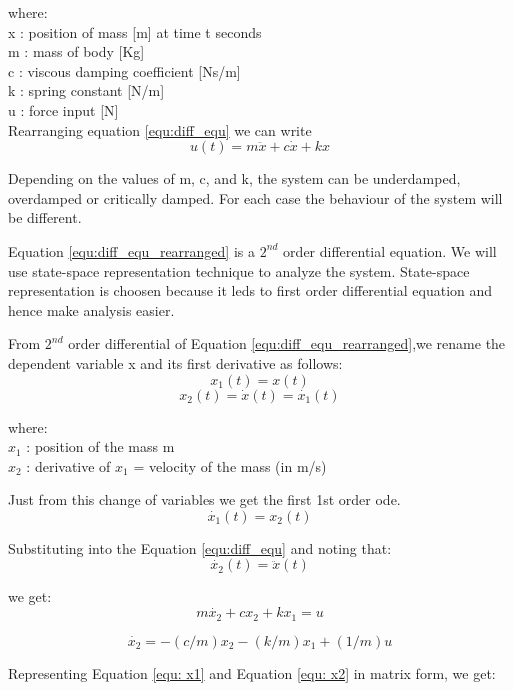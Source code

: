 \documentclass[a4paper,12pt,twocolumn]{article}
\begin{document}
where: \\
x : position of mass [m] at time t seconds \\
m : mass of body [Kg] \\
c : viscous damping coefficient [Ns/m] \\
k : spring constant [N/m] \\
u : force input [N] \\

Rearranging equation \ref{equ:diff_equ} we can write 
\begin{equation}
  u(t) = m \ddot{x} + c \dot{x} + kx
 \label{equ:diff_equ_rearranged}
\end{equation}

Depending on the values of m, c, and k, the system can be underdamped, overdamped or critically damped. For each case the behaviour of the system will be different.

Equation \ref{equ:diff_equ_rearranged} is a $2^{nd}$ order differential equation. We will use state-space representation technique to analyze the system. State-space representation is choosen because it leds to first order differential equation and hence make analysis easier.

From $2^{nd}$ order differential of Equation \ref{equ:diff_equ_rearranged},we rename the dependent variable x and its first derivative as follows: \\
  \[ x_1(t) = x(t) \] 
  \[ x_2(t) = \dot{x}(t) = \dot{x_1}(t) \] 
  
where: \\
$x_1$ : position of the mass m \\
$x_2$ : derivative of $x_1$ = velocity of the mass (in m/s)

Just from this change of variables we get the first 1st order ode.
\begin{equation}
\dot{x_1}(t)=x_2(t)
\label{equ:x1}
\end{equation}

Substituting into the Equation \ref{equ:diff_equ} and noting that:
\[\dot{x_2}(t)=\ddot{x}(t)\]

we get:
\begin{equation}
m \dot{x_2} + c {x_2} + k x_1 = u
\end{equation}

\begin{equation}
\dot{x_2} = - (c/m) {x_2} - (k/m) x_1 + (1/m) u  
\label{equ: x2}
\end{equation}

Representing Equation \ref{equ: x1} and Equation \ref{equ: x2} in matrix form, we get:
\end{document}
